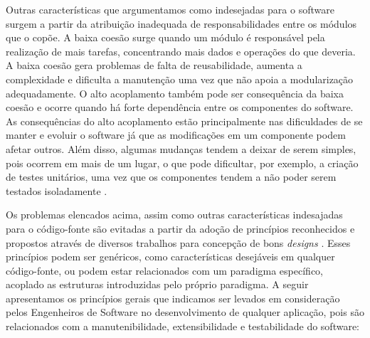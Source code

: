 Outras características que argumentamos como indesejadas para o software surgem a partir da atribuição inadequada de responsabilidades entre os módulos que o copõe.
%
A baixa coesão surge quando um módulo é responsável pela realização de mais tarefas, concentrando mais dados e operações do que deveria. A baixa coesão gera problemas de falta de reusabilidade, aumenta a complexidade e dificulta a manutenção uma vez que não apoia a modularização adequadamente.
%
O alto acoplamento também pode ser consequência da baixa coesão e ocorre quando há forte dependência entre os componentes do software.
%
As consequências do alto acoplamento estão principalmente nas dificuldades de se manter e evoluir o software já que as modificações em um componente podem afetar outros.
%
Além disso, algumas mudanças tendem a deixar de serem simples, pois ocorrem em mais de um lugar, o que pode dificultar, por exemplo, a criação de testes unitários, uma vez que os componentes tendem a não poder serem testados isoladamente \cite{martensson2005}.


Os problemas elencados acima, assim como outras características indesajadas para o código-fonte são evitadas a partir da adoção de princípios reconhecidos e propostos através de diversos trabalhos para concepção de bons \emph{designs} \cite{martin2002} \cite{lakos1996} \cite{demeyer2002} \cite{lieberherr1996}. 
%
Esses princípios podem ser genéricos, como características desejáveis em qualquer código-fonte, ou podem estar relacionados com um paradigma específico, acoplado as estruturas introduzidas pelo próprio paradigma.
%
A seguir apresentamos os princípios gerais que indicamos ser levados em consideração pelos Engenheiros de Software no desenvolvimento de qualquer aplicação, pois são relacionados com a manutenibilidade, extensibilidade e testabilidade do software:

